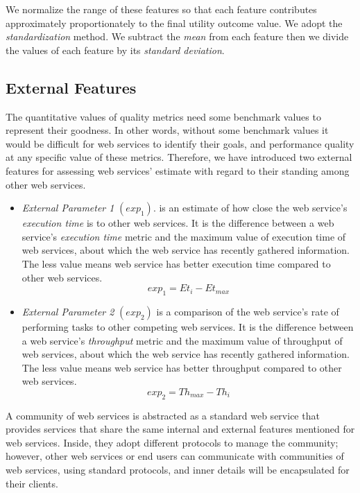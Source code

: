 \documentclass[10pt,journal,cspaper,compsoc]{IEEEtran}
\begin{document}
	We normalize the range of these features so that each feature contributes approximately proportionately to the final utility outcome value. We adopt the \emph{standardization} method. We subtract the \emph{mean} from each feature then we divide the values of each feature by its \emph{standard deviation}.


\subsection{External Features}\label{s:ef}

The quantitative values of quality metrics need some benchmark values to represent their goodness. In other words, without some benchmark values it would be difficult for web services to identify their goals, and performance quality at any specific value of these metrics. Therefore, we have introduced two external features for assessing web services' estimate with regard to their standing among other web services.

\begin{itemize}
  \item \emph{External Parameter 1} $(exp_1)$. is an estimate of how close the web service's \emph{execution time} is to other web services. It is the difference between a web service's \emph{execution time} metric and the maximum value of execution time of web services, about which the web service has recently gathered information. The less value means web service has better execution time compared to other web services.
	\begin{equation}\label{exp_1:f}
		exp_1 = Et_{i} - Et_{max}
	\end{equation}
	\item \emph{External Parameter 2} $(exp_2)$ is a comparison of the web service's rate of performing tasks to other competing web services. It is the difference between a web service's \emph{throughput} metric and the maximum value of throughput of web services, about which the web service has recently gathered information. The less value means web service has better throughput compared to other web services.
	\begin{equation}\label{exp_2Lf}
		exp_2 = Th_{max} - Th_{i}
	\end{equation}
\end{itemize}

A community of web services is abstracted as a standard web service that provides services that share the same internal and external features mentioned for web services. Inside, they adopt different protocols to manage the community; however, other web services or end users can communicate with communities of web services, using standard protocols, and inner details will be encapsulated for their clients.
\end{document}
